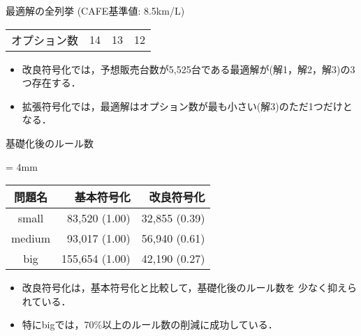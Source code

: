 \documentclass[dvipdfmx, 11pt]{beamer}
\begin{document}
\begin{frame}{最適解の全列挙 {\normalsize (CAFE基準値: 8.5km/L)}}
\begin{exampleblock}{}
\begin{tabular}{l|l|c|c|c||c|c|c||c|c|c}
    \multicolumn{2}{l|}{オプション数}  & \multicolumn{3}{c||}{14} & \multicolumn{3}{c||}{13}  &\multicolumn{3}{c}{12}\\ 
  \end{tabular}
 \end{exampleblock}
 \begin{itemize}
  \item 改良符号化では，予想販売台数が5,525台である最適解が(解1，解2，解3)の3つ存在する．
  \item 拡張符号化では，最適解はオプション数が最も小さい(解3)のただ1つだけとなる．
 \end{itemize}
\end{frame}
\begin{frame}{基礎化後のルール数}
 \begin{exampleblock}{}\centering 
  \renewcommand{\arraystretch}{1.2}
  \tabcolsep = 4mm
  \begin{tabular}{crr} 
   問題名    & 基本符号化       & 改良符号化    \\ \hline
   small    &  83,520 (1.00)  & 32,855 (0.39) \\ 
   medium   &  93,017 (1.00)  & 56,940 (0.61) \\
   big	    & 155,654 (1.00)  & 42,190 (0.27) \\ 
  \end{tabular}
 \end{exampleblock}
 \begin{itemize}
  \item 改良符号化は，基本符号化と比較して，基礎化後のルール数を
	少なく抑えられている．
  \item 特にbigでは，70\%以上のルール数の削減に成功している．
 \end{itemize}
\end{frame}
\end{document}
